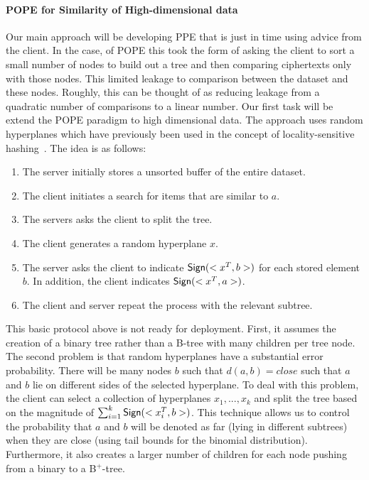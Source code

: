 \paragraph{POPE for Similarity of High-dimensional data}
Our main approach will be developing PPE that is just in time using advice from the client.  In the case, of POPE this took the form of asking the client to sort a small number of nodes to build out a tree and then comparing ciphertexts only with those nodes.  This limited leakage to comparison between the dataset and these nodes.  Roughly, this can be thought of as reducing leakage from a quadratic number of comparisons to a linear number.  Our first task will be extend the POPE paradigm to high dimensional data.  The approach uses random hyperplanes which have previously been used in the concept of locality-sensitive hashing~\cite{charikar2002similarity}.  The idea is as follows:

\begin{enumerate}
\item The server initially stores a unsorted buffer of the entire dataset.
\item The client initiates a search for items that are similar to $a$.
\item The servers asks the client to split the tree.
\item The client generates a random hyperplane $x$.  
\item The server asks the client to indicate $\mathsf{Sign}(<x^T,b>)$ for each stored element $b$. In addition, the client indicates $\mathsf{Sign}(<x^T,a>)$.
\item The client and server repeat the process with the relevant subtree.
\end{enumerate} 

This basic protocol above is not ready for deployment.  First, it assumes the creation of a binary tree rather than a B-tree with many children per tree node. The second problem is that random hyperplanes have a substantial error probability.  There will be many nodes $b$ such that $d(a, b)=close$ such that $a$ and $b$ lie on different sides of the selected hyperplane.  To deal with this problem, the client can select a collection of hyperplanes $x_1,..., x_k$ and split the tree based on the magnitude of $\sum_{i=1}^k \mathsf{Sign}(<x_i^T, b>)$.  This technique allows us to control the probability that $a$ and $b$ will be denoted as far (lying in different subtrees) when they are close (using tail bounds for the binomial distribution).  Furthermore, it also creates a larger number of children for each node pushing from a binary to a B$^+$-tree.

